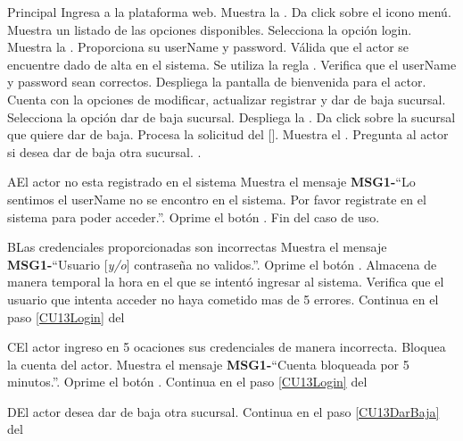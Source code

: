 	\begin{UCtrayectoria}{Principal}
		\UCpaso[\UCactor] Ingresa a la plataforma web.
		\UCpaso Muestra la .
		\UCpaso[\UCactor] Da click sobre el icono menú.
		\UCpaso Muestra un listado de las opciones disponibles.
		\UCpaso[\UCactor] Selecciona la opción login.
		\UCpaso Muestra la  \label{CU13Login}.
		\UCpaso[\UCactor] Proporciona su userName y password.
		\UCpaso Válida que el actor se encuentre dado de alta en el sistema. Se utiliza la regla  .
		\UCpaso Verifica que el userName y password sean correctos.
		\UCpaso Despliega la pantalla de bienvenida para el actor. Cuenta con la opciones de modificar, actualizar registrar y dar de baja sucursal.
		\UCpaso[\UCactor] Selecciona la opción dar de baja sucursal.
		\UCpaso Despliega la .\label{CU13DarBaja}
		\UCpaso[\UCactor] Da click sobre la sucursal que quiere dar de baja.
		\UCpaso Procesa la solicitud del [\UCactor].
		\UCpaso Muestra el . 
		\UCpaso Pregunta al actor si desea dar de baja otra sucursal. .
	\end{UCtrayectoria}
		
		\begin{UCtrayectoriaA}{A}{El actor no esta registrado en el sistema}
			\UCpaso Muestra el mensaje {\bf MSG1-}``Lo sentimos el userName no se encontro en el sistema. Por favor registrate en el sistema para poder acceder.''.
			\UCpaso[\UCactor] Oprime el botón .
			\UCpaso Fin del caso de uso.
		\end{UCtrayectoriaA}
		
		\begin{UCtrayectoriaA}{B}{Las credenciales proporcionadas son incorrectas}
			\UCpaso Muestra el mensaje {\bf MSG1-}``Usuario [{\em y/o}] contraseña no validos.''.
			\UCpaso[\UCactor] Oprime el botón .
			\UCpaso Almacena de manera temporal la hora en el que se intentó ingresar al sistema.
			\UCpaso Verifica que el usuario que intenta acceder no haya cometido mas de 5 errores. 
			\UCpaso Continua en el paso \ref{CU13Login} del 
		\end{UCtrayectoriaA}		

		\begin{UCtrayectoriaA}{C}{El actor ingreso en 5 ocaciones sus credenciales de manera incorrecta.}
			\UCpaso Bloquea la cuenta del actor.
			\UCpaso Muestra el mensaje {\bf MSG1-}``Cuenta bloqueada por 5 minutos.''.
			\UCpaso[\UCactor] Oprime el botón .
			\UCpaso Continua en el paso \ref{CU13Login} del 
		\end{UCtrayectoriaA}		
		
		\begin{UCtrayectoriaA}{D}{El actor desea dar de baja otra sucursal.}
			\UCpaso Continua en el paso \ref{CU13DarBaja} del 
		\end{UCtrayectoriaA}
